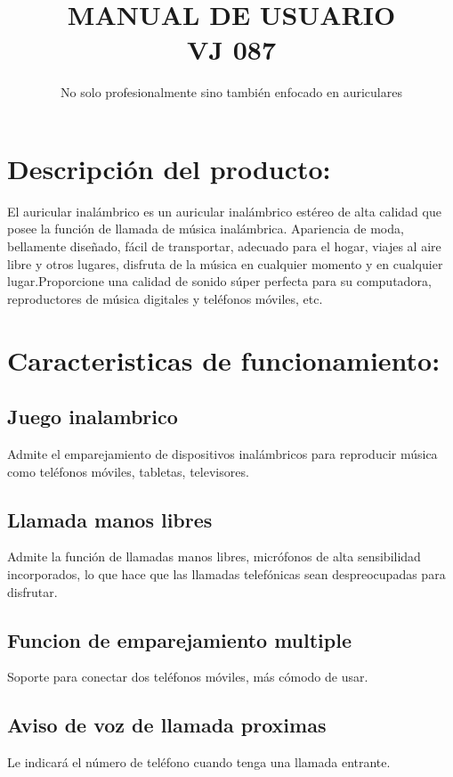 \documentclass[12pt, letterpaper]{article}
\title{MANUAL DE USUARIO \\ VJ 087}
\author{No solo profesionalmente sino también enfocado en auriculares}
\begin{document}
     \begin{titlepage}
          \maketitle
     \end{titlepage}

     \tableofcontents
          \section{Descripción del producto:}
          El auricular inalámbrico es un auricular inalámbrico estéreo de alta calidad que posee la función de llamada de música inalámbrica.
          Apariencia de moda, bellamente diseñado, fácil de transportar, adecuado para el hogar, viajes al aire libre y otros lugares,
          disfruta de la música en cualquier momento y en cualquier lugar.Proporcione una calidad de sonido súper perfecta para su computadora, 		
          reproductores de música digitales y teléfonos móviles, etc.
          \\
          \section{Caracteristicas de funcionamiento:}
               \subsection{Juego inalambrico}
               Admite el emparejamiento de dispositivos inalámbricos para reproducir música como teléfonos móviles, tabletas, televisores.
               \subsection{Llamada manos libres}
               Admite la función de llamadas manos libres, micrófonos de alta sensibilidad incorporados, lo que hace que las llamadas 
               telefónicas sean despreocupadas para disfrutar.
               \subsection{Funcion de emparejamiento multiple}
               Soporte para conectar dos teléfonos móviles, más cómodo de usar.
               \subsection{Aviso de voz de llamada proximas}
               Le indicará el número de teléfono cuando tenga una llamada entrante.
\end{document}
